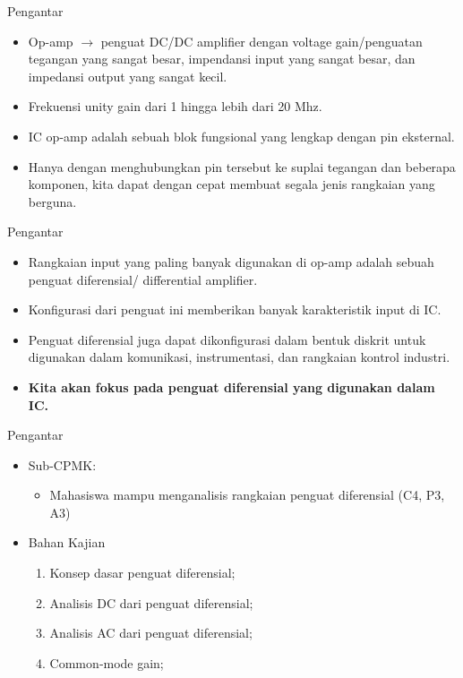 \documentclass[aspectratio=169]{beamer}
\begin{document}
\begin{frame}{Pengantar}
	\begin{itemize}
		\item Op-amp $ \rightarrow $ penguat DC/DC amplifier dengan voltage gain/penguatan tegangan yang sangat besar, impendansi input yang sangat besar, dan impedansi output yang sangat kecil.
		\item Frekuensi unity gain dari 1 hingga lebih dari 20 Mhz.
		\item IC op-amp adalah sebuah blok fungsional yang lengkap dengan pin eksternal.
		\item Hanya dengan menghubungkan pin tersebut ke suplai tegangan dan beberapa komponen, kita dapat dengan cepat membuat segala jenis rangkaian yang berguna.
	\end{itemize}
\end{frame}

\begin{frame}{Pengantar}
	\begin{itemize}
		\item Rangkaian input yang paling banyak digunakan di op-amp adalah sebuah penguat diferensial/ differential amplifier.
		\item Konfigurasi dari penguat ini memberikan banyak karakteristik input di IC.
		\item Penguat diferensial juga dapat dikonfigurasi dalam bentuk diskrit untuk digunakan dalam komunikasi, instrumentasi, dan rangkaian kontrol industri.
		\item \textbf{Kita akan fokus pada penguat diferensial yang digunakan dalam IC.}
	\end{itemize}
\end{frame}

\begin{frame}{Pengantar}
	\begin{itemize}
		\item Sub-CPMK:
		\begin{itemize}
			\item Mahasiswa mampu menganalisis rangkaian penguat diferensial (C4, P3, A3)
		\end{itemize}
		\item Bahan Kajian
		\begin{enumerate}
			\item Konsep dasar penguat diferensial;
			\item Analisis DC dari penguat diferensial;
			\item Analisis AC dari penguat diferensial;
			\item Common‐mode gain;
		\end{enumerate}
	\end{itemize}
\end{frame}
\end{document}
